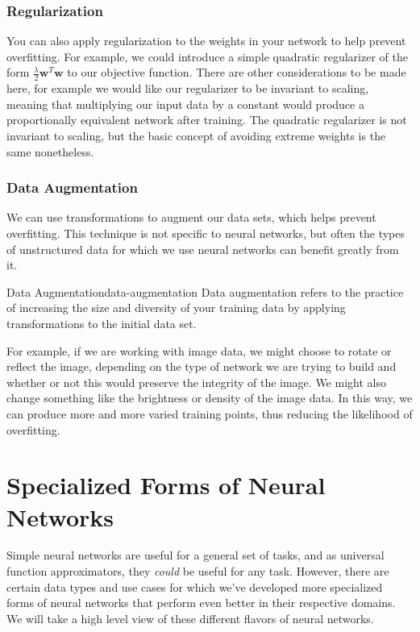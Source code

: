 \subsubsection{Regularization}
You can also apply regularization to the weights in your network to help prevent overfitting. For example, we could introduce a simple quadratic regularizer of the form $\frac{\lambda}{2} \textbf{w}^{T}\textbf{w}$ to our objective function. There are other considerations to be made here, for example we would like our regularizer to be invariant to scaling, meaning that multiplying our input data by a constant would produce a proportionally equivalent network after training. The quadratic regularizer is not invariant to scaling, but the basic concept of avoiding extreme weights is the same nonetheless.

\subsubsection{Data Augmentation}
We can use transformations to augment our data sets, which helps prevent overfitting. This technique is not specific to neural networks, but often the types of unstructured data for which we use neural networks can benefit greatly from it.
\begin{definition}{Data Augmentation}{data-augmentation}
Data augmentation refers to the practice of increasing the size and diversity of your training data by applying transformations to the initial data set.
\end{definition}
For example, if we are working with image data, we might choose to rotate or reflect the image, depending on the type of network we are trying to build and whether or not this would preserve the integrity of the image. We might also change something like the brightness or density of the image data. In this way, we can produce more and more varied training points, thus reducing the likelihood of overfitting.

\section{Specialized Forms of Neural Networks}
Simple neural networks are useful for a general set of tasks, and as universal function approximators, they \textit{could} be useful for any task. However, there are certain data types and use cases for which we've developed more specialized forms of neural networks that perform even better in their respective domains. We will take a high level view of these different flavors of neural networks.

